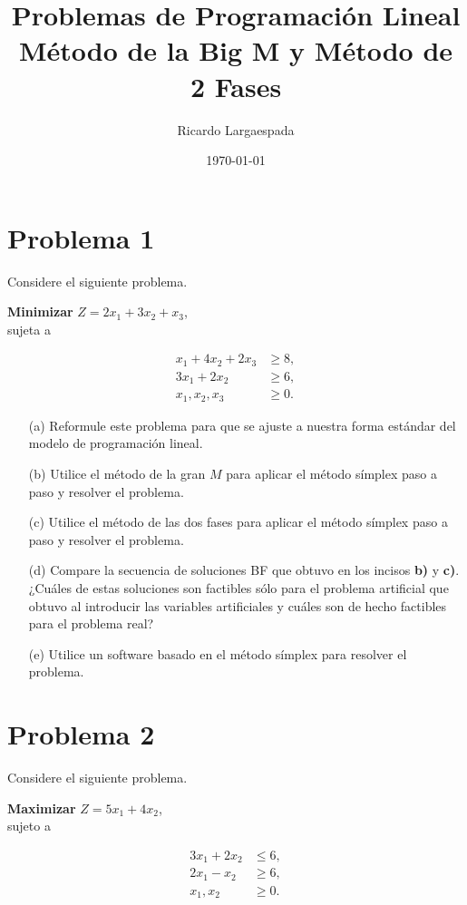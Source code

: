 \documentclass{article}
\title{Problemas de Programación Lineal\\{\small Método de la Big M y Método de 2 Fases}}
\author{Ricardo Largaespada}
\date{\today}
\begin{document}
\maketitle

\section{Problema 1}
Considere el siguiente problema.

\textbf{Minimizar} \quad $Z = 2x_1 + 3x_2 + x_3$,\\

sujeta a 

\[
\begin{aligned}
x_1 + 4x_2 + 2x_3 & \geq 8, \\
3x_1 + 2x_2 & \geq 6, \\
x_1, x_2, x_3 &\geq 0.
\end{aligned}
\]

\begin{enumerate}
    \item[(a)] Reformule este problema para que se ajuste a nuestra forma estándar del modelo de programación lineal.
    \item[(b)] Utilice el método de la gran $M$ para aplicar el método símplex paso a paso y resolver el problema.
    \item[(c)] Utilice el método de las dos fases para aplicar el método símplex paso a paso y resolver el problema.
    \item[(d)] Compare la secuencia de soluciones BF que obtuvo en los incisos \textbf{b)} y \textbf{c)}. ¿Cuáles de estas soluciones son factibles sólo para el problema artificial que obtuvo al introducir las variables artificiales y cuáles son de hecho factibles para el problema real?
    \item[(e)] Utilice un software basado en el método símplex para resolver el problema.
\end{enumerate}

\section{Problema 2}
Considere el siguiente problema.

\textbf{Maximizar} \quad $Z = 5x_1 + 4x_2$,\\

sujeto a 

\[
\begin{aligned}
3x_1 + 2x_2 & \leq 6, \\
2x_1 - x_2 & \geq 6, \\
x_1, x_2 & \geq 0.
\end{aligned}
\]
\end{document}
